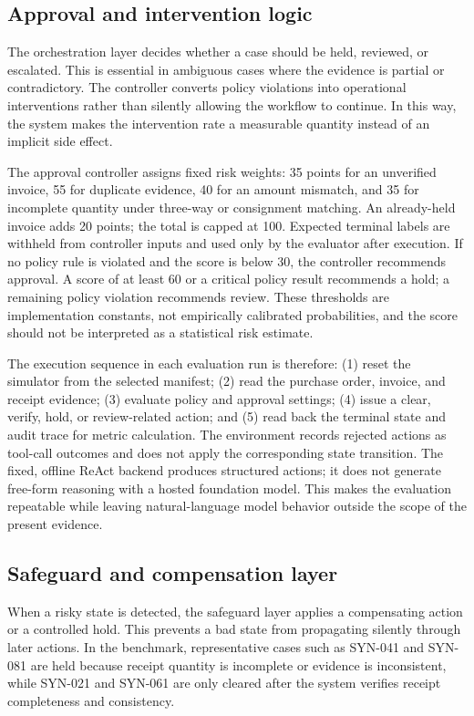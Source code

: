 \documentclass[conference]{IEEEtran}
\begin{document}
\subsection{Approval and intervention logic}

The orchestration layer decides whether a case should be held, reviewed, or escalated. This is essential in ambiguous cases where the evidence is partial or contradictory. The controller converts policy violations into operational interventions rather than silently allowing the workflow to continue. In this way, the system makes the intervention rate a measurable quantity instead of an implicit side effect.

The approval controller assigns fixed risk weights: 35 points for an unverified invoice, 55 for duplicate evidence, 40 for an amount mismatch, and 35 for incomplete quantity under three-way or consignment matching. An already-held invoice adds 20 points; the total is capped at 100. Expected terminal labels are withheld from controller inputs and used only by the evaluator after execution. If no policy rule is violated and the score is below 30, the controller recommends approval. A score of at least 60 or a critical policy result recommends a hold; a remaining policy violation recommends review. These thresholds are implementation constants, not empirically calibrated probabilities, and the score should not be interpreted as a statistical risk estimate.

The execution sequence in each evaluation run is therefore: (1) reset the simulator from the selected manifest; (2) read the purchase order, invoice, and receipt evidence; (3) evaluate policy and approval settings; (4) issue a clear, verify, hold, or review-related action; and (5) read back the terminal state and audit trace for metric calculation. The environment records rejected actions as tool-call outcomes and does not apply the corresponding state transition. The fixed, offline ReAct backend produces structured actions; it does not generate free-form reasoning with a hosted foundation model. This makes the evaluation repeatable while leaving natural-language model behavior outside the scope of the present evidence.

\subsection{Safeguard and compensation layer}

When a risky state is detected, the safeguard layer applies a compensating action or a controlled hold. This prevents a bad state from propagating silently through later actions. In the benchmark, representative cases such as SYN-041 and SYN-081 are held because receipt quantity is incomplete or evidence is inconsistent, while SYN-021 and SYN-061 are only cleared after the system verifies receipt completeness and consistency.
\end{document}
